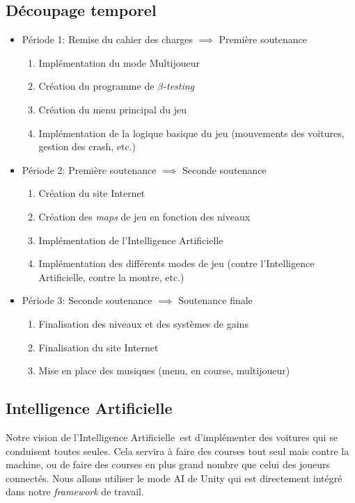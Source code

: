 \documentclass[11pt,a4paper]{article}
\newcommand{\AI}{Intelligence Artificielle}
\begin{document}
{  \subsection{Découpage temporel}
    \begin{itemize}
      \item Période 1: Remise du cahier des charges \(\implies\) Première soutenance
        \begin{enumerate}
          \item Implémentation du mode Multijoueur
          \item Création du programme de \(\beta\)\textit{-testing}
          \item Création du menu principal du jeu
          \item Implémentation de la logique basique du jeu (mouvements des voitures, gestion des crash, etc.)
        \end{enumerate}
      \item Période 2: Première soutenance \(\implies\) Seconde soutenance
        \begin{enumerate}
          \item Création du site Internet
          \item Création des \textit{maps} de jeu en fonction des niveaux
          \item Implémentation de l'\AI
          \item Implémentation des différents modes de jeu (contre l'\AI, contre la montre, etc.)
        \end{enumerate}
      \item Période 3: Seconde soutenance \(\implies\) Soutenance finale
        \begin{enumerate}
          \item Finalisation des niveaux et des systèmes de gains
          \item Finalisation du site Internet
          \item Mise en place des musiques (menu, en course, multijoueur)
        \end{enumerate}
    \end{itemize}
  \subsection{\AI}
    Notre vision de l'\AI\, est d'implémenter des voitures qui se conduisent toutes seules.
    Cela servira à faire des courses tout seul mais contre la machine, ou de faire des courses en plus grand
    nombre que celui des joueurs connectés. Nous allons utiliser le mode AI de Unity qui est directement intégré
    dans notre \textit{framework} de travail.
}
\end{document}
